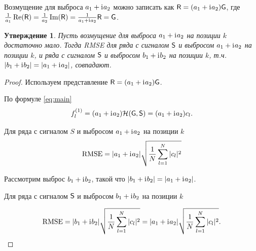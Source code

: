 \documentclass[specialist,
               substylefile = spbu.rtx,
               subf,href,colorlinks=true, 12pt]{disser}
\newtheorem{statement}{Утверждение}
\begin{document}
Возмущение для выброса $a_1 + \mathrm{i}\mkern1mu a_2$ можно записать как  $\textsf{R} = (a_1 + \mathrm{i}\mkern1mu a_2)\textsf{G}$, где $\frac{1}{a_1}\Re(\textsf{R}) = \frac{1}{a_2}\Im(\textsf{R}) = \frac{1}{a_1 + \mathrm{i}\mkern1mu a_2}\textsf{R} = \textsf{G}$.
\begin{statement}\label{st:RMSEinv}
	Пусть возмущение для выброса $a_1 + \mathrm{i}\mkern1mu a_2$ на позиции $k$ достаточно мало.
	Тогда RMSE для ряда с сигналом $\textsf{S}$ и выбросом $a_1 + \mathrm{i}\mkern1mu a_2$ на позиции $k$, и  ряда с сигналом $\textsf{S}$ и выбросом $b_1 + \mathrm{i}\mkern1mu b_2$ на позиции $k$, т.ч. $|b_1 + \mathrm{i}\mkern1mu b_2| = |a_1 + \mathrm{i}\mkern1mu a_2|$, совпадают.
\end{statement}
\begin{proof}
	Используем представление $\textsf{R} = (a_1 + \mathrm{i}\mkern1mu a_2)\textsf{G}$.
	
	По формуле \eqref{eq:main}
	$$f^{(1)}_l = (a_1 + \mathrm{i}\mkern1mu a_2)\mathcal{H}(\textsf{G}, \textsf{S}) = (a_1 + \mathrm{i}\mkern1mu a_2)c_l.$$
	
	Для ряда с сигналом $S$ и выбросом $a_1 + \mathrm{i}\mkern1mu a_2$ на позиции $k$
	$$\text{RMSE} = |a_1 + \mathrm{i}\mkern1mu a_2|\sqrt{\frac{1}{N}\sum_{l = 1}^{N} |c_l|^2} $$
	
	Рассмотрим выброс $b_1 + \mathrm{i}\mkern1mu b_2$, такой что $|b_1 + \mathrm{i}\mkern1mu b_2| = |a_1 + \mathrm{i}\mkern1mu a_2|$.
	
	Для ряда с сигналом $\textsf{S}$ и выбросом $b_1 + \mathrm{i}\mkern1mu b_2$ на позиции $k$
	
	$$\text{RMSE} = |b_1 + \mathrm{i}\mkern1mu b_2| \sqrt{\frac{1}{N}\sum_{l = 1}^{N} |c_l|^2} = |a_1 + \mathrm{i}\mkern1mu a_2| \sqrt{\frac{1}{N}\sum_{l = 1}^{N} |c_l|^2}.$$
\end{proof}
\end{document}
